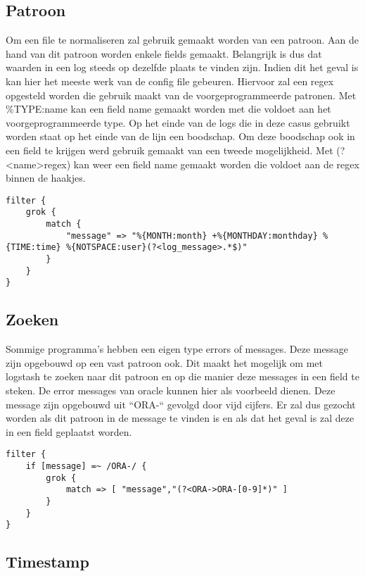 \subsection{Patroon}
\label{subsec:patroon}

Om een file te normaliseren zal gebruik gemaakt worden van een patroon. Aan de hand van dit patroon worden enkele fields gemaakt. Belangrijk is dus dat waarden in een log steeds op dezelfde plaats te vinden zijn.
Indien dit het geval is kan hier het meeste werk van de config file gebeuren. Hiervoor zal een regex opgesteld worden die gebruik maakt van de voorgeprogrammeerde patronen. 
Met \%{TYPE:name} kan een field name gemaakt worden met die voldoet aan het voorgeprogrammeerde type. Op het einde van de logs die in deze casus gebruikt worden staat op het einde van de lijn een boodschap.
Om deze boodschap ook in een field te krijgen werd gebruik gemaakt van een tweede mogelijkheid. Met (?<name>regex) kan weer een field name gemaakt worden die voldoet aan de regex binnen de haakjes.

\lstset{escapechar=@,style=customc}  
\begin{lstlisting}[frame=single]  
filter {
	grok {
		match {
			"message" => "%{MONTH:month} +%{MONTHDAY:monthday} %{TIME:time} %{NOTSPACE:user}(?<log_message>.*$)"	 
		}
	}
}
\end{lstlisting}

\subsection{Zoeken}
\label{subsec:zoeken}

Sommige programma’s hebben een eigen type errors of messages. Deze message zijn opgebouwd op een vast patroon ook. Dit maakt het mogelijk om met logstash te zoeken naar dit patroon en op die manier deze messages in een field te steken. De error messages van oracle kunnen hier als voorbeeld dienen. Deze message zijn opgebouwd uit “ORA-“ gevolgd door vijd cijfers. Er zal dus gezocht worden als dit patroon in de message te vinden is en als dat het geval is zal deze in een field geplaatst worden.

\lstset{escapechar=@,style=customc}  
\begin{lstlisting}[frame=single]  
filter {
	if [message] =~ /ORA-/ {
		grok {
			match => [ "message","(?<ORA->ORA-[0-9]*)" ]
		}  
	}
}
\end{lstlisting}

\subsection{Timestamp}
\label{subsec:timestamp}

